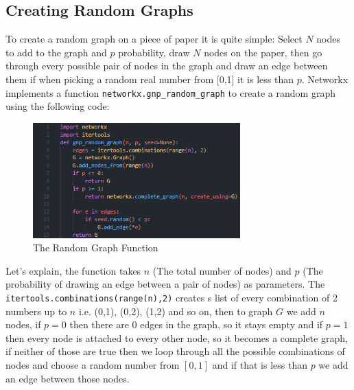 \documentclass{article}
\begin{document}
        \subsection{Creating Random Graphs}
        To create a random graph on a piece of paper it is quite simple: Select $N$ nodes to add to the graph and $p$ probability, draw $N$ nodes on the paper, then go through every possible pair of nodes in the graph and draw an edge between them if when picking a random real number from [0,1] it is less than $p$. Networkx implements a function \verb|networkx.gnp_random_graph| to create a random graph using the following code:
        \begin{figure}[H]
            \includegraphics[width=8cm]{images/CreatingRandomGraphs.png}
            \caption{The Random Graph Function}
            \label{fig:RandomGraph1}
        \end{figure}
        Let's explain, the function takes $n$ (The total number of nodes) and $p$ (The probability of drawing an edge between a pair of nodes) as parameters. The \verb|itertools.combinations(range(n),2)| creates s list of every combination of 2 numbers up to $n$ i.e. (0,1), (0,2), (1,2) and so on, then to graph $G$ we add $n$ nodes, if $p = 0$ then there are 0 edges in the graph, so it stays empty and if $p =1$ then every node is attached to every other node, so it becomes a complete graph, if neither of those are true then we loop through all the possible combinations of nodes and choose a random number from $[0,1]$ and if that is less than $p$ we add an edge between those nodes.
\end{document}
